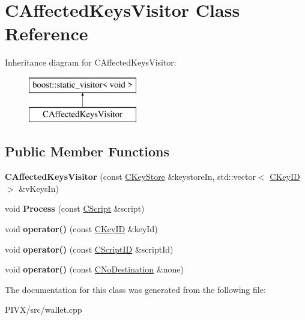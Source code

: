 \hypertarget{class_c_affected_keys_visitor}{}\section{C\+Affected\+Keys\+Visitor Class Reference}
\label{class_c_affected_keys_visitor}
Inheritance diagram for C\+Affected\+Keys\+Visitor\+:\begin{figure}[H]
\begin{center}
\leavevmode
\includegraphics[height=2.000000cm]{class_c_affected_keys_visitor}
\end{center}
\end{figure}
\subsection*{Public Member Functions}
\begin{DoxyCompactItemize}
\item 
\mbox{\label{class_c_affected_keys_visitor_a97f7f932abb21ae791993a284183ab89}} 
{\bfseries C\+Affected\+Keys\+Visitor} (const \mbox{\hyperlink{class_c_key_store}{C\+Key\+Store}} \&keystore\+In, std\+::vector$<$ \mbox{\hyperlink{class_c_key_i_d}{C\+Key\+ID}} $>$ \&v\+Keys\+In)
\item 
\mbox{\label{class_c_affected_keys_visitor_a749859ce2a826e2d60c8fe31685efae3}} 
void {\bfseries Process} (const \mbox{\hyperlink{class_c_script}{C\+Script}} \&script)
\item 
\mbox{\label{class_c_affected_keys_visitor_abc13269c85eb964555cfe23c60b8c9b1}} 
void {\bfseries operator()} (const \mbox{\hyperlink{class_c_key_i_d}{C\+Key\+ID}} \&key\+Id)
\item 
\mbox{\label{class_c_affected_keys_visitor_a01b52c5a4311ae3985d1e5753e033215}} 
void {\bfseries operator()} (const \mbox{\hyperlink{class_c_script_i_d}{C\+Script\+ID}} \&script\+Id)
\item 
\mbox{\label{class_c_affected_keys_visitor_abeff400fed1ba87283930538f9164640}} 
void {\bfseries operator()} (const \mbox{\hyperlink{class_c_no_destination}{C\+No\+Destination}} \&none)
\end{DoxyCompactItemize}


The documentation for this class was generated from the following file\+:\begin{DoxyCompactItemize}
\item 
P\+I\+V\+X/src/wallet.\+cpp\end{DoxyCompactItemize}
